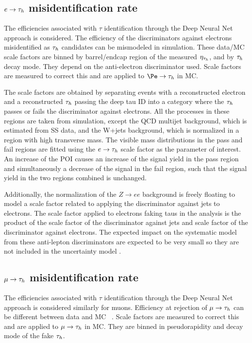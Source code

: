 \subsection{$e \rightarrow \tau_h$ misidentification rate}
The efficiencies associated with $\tau$ identification through the Deep Neural Net approach is considered. 
The efficiency of the discriminators against electrons misidentified as $\tau_h$ candidates can be mismodeled in simulation. 
These data/MC scale factors are
binned by barrel/endcap region of the measured $\eta_{\tau_h}$, and by $\tau_h$ decay mode. They depend on the anti-electron discriminator used. 
Scale factors are measured to correct this and are applied to $\Pe \rightarrow \tauh$ in MC. 

The scale factors are obtained by separating events with a reconstructed electron and a reconstructed $\tau_h$ passing 
the deep tau ID into a category where the $\tau_h$ passes or fails the discriminator against electrons. All the processes in 
these regions are taken from simulation, except the QCD multijet background, which is estimated from SS data, and the W+jets background, which is normalized in a region with high transverse mass. The visible mass distributions in the pass and fail regions are fitted using the $e\to\tau_h$ scale factor as the parameter of interest. An increase of the POI causes an increase of the signal yield in the pass region and simultaneously a decrease of the signal in the fail region, such that the signal yield in the two regions combined is unchanged. 

Additionally, the normalization of the $Z \to e  e$ background is freely floating to model a scale factor related to applying the discriminator against jets to electrons. The scale factor applied to electrons faking taus in the analysis is the product of the scale factor of the discriminator against jets and scale factor of the discriminator against electrons. 
The expected impact on the systematic model from these anti-lepton discriminators are expected to be very small so they are not included in the uncertainty model .

\subsection{$\mu \rightarrow \tau_h$ misidentification rate}

The efficiencies associated with $\tau$ identification through the Deep Neural Net approach is considered similarly for muons.
Efficiency at rejection of $\mu \to\tau_h$ can be different between data and MC ~\cite{TAUIDTwiki}. Scale factors are measured to correct this
and are applied to $\mu \to\tau_h$ in MC. They are binned in pseudorapidity and decay mode of the fake $\tau_h$.  

